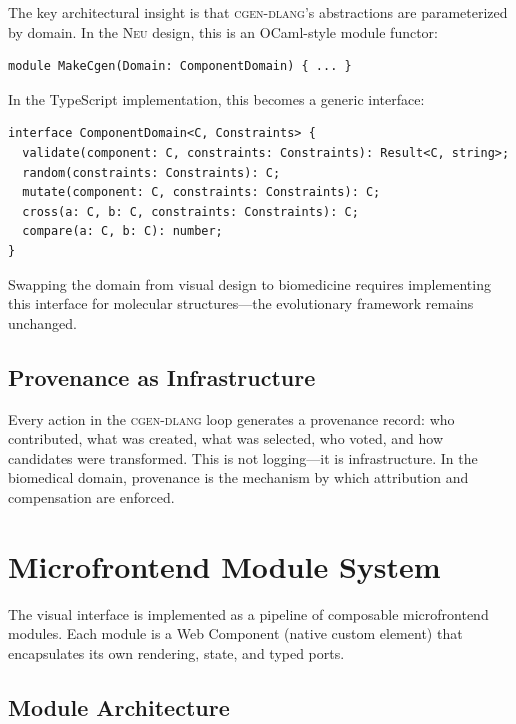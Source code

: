 \documentclass[11pt,letterpaper]{article}
\newcommand{\neu}{\textsc{Neu}}
\newcommand{\cgen}{\textsc{cgen-dlang}}
\begin{document}
The key architectural insight is that \cgen{}'s abstractions are parameterized by domain. In the \neu{} design, this is an OCaml-style module functor:

\begin{lstlisting}
module MakeCgen(Domain: ComponentDomain) { ... }
\end{lstlisting}

In the TypeScript implementation, this becomes a generic interface:

\begin{lstlisting}
interface ComponentDomain<C, Constraints> {
  validate(component: C, constraints: Constraints): Result<C, string>;
  random(constraints: Constraints): C;
  mutate(component: C, constraints: Constraints): C;
  cross(a: C, b: C, constraints: Constraints): C;
  compare(a: C, b: C): number;
}
\end{lstlisting}

Swapping the domain from visual design to biomedicine requires implementing this interface for molecular structures---the evolutionary framework remains unchanged.

\subsection{Provenance as Infrastructure}

Every action in the \cgen{} loop generates a provenance record: who contributed, what was created, what was selected, who voted, and how candidates were transformed. This is not logging---it is infrastructure. In the biomedical domain, provenance is the mechanism by which attribution and compensation are enforced.

\section{Microfrontend Module System}
\label{sec:microfrontends}

The visual interface is implemented as a pipeline of composable microfrontend modules. Each module is a Web Component (native custom element) that encapsulates its own rendering, state, and typed ports.

\subsection{Module Architecture}
\end{document}
